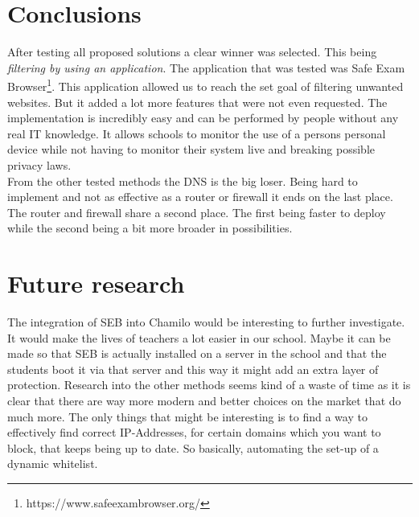 \documentclass[a0,portrait]{a0poster}
\begin{document}
\begin{multicols}{2}
\section*{Conclusions}
\color{black}
After testing all proposed solutions a clear winner was selected. This being \textit{filtering by using an application}. The application that was tested was Safe Exam Browser\footnote{https://www.safeexambrowser.org/}. This application allowed us to reach the set goal of filtering unwanted websites. But it added a lot more features that were not even requested. The implementation is incredibly easy and can be performed by people without any real IT knowledge. It allows schools to monitor the use of a persons personal device while not having to monitor their system live and breaking possible privacy laws.\\
From the other tested methods the DNS is the big loser. Being hard to implement and not as effective as a router or firewall it ends on the last place. The router and firewall share a second place. The first being faster to deploy while the second being a bit more broader in possibilities.
\color{HoGentAccent1} 
\section*{Future research}
\color{black}
The integration of SEB into Chamilo would be interesting to further investigate. It would
make the lives of teachers a lot easier in our school. Maybe it can be made so that SEB
is actually installed on a server in the school and that the students boot it via that server
and this way it might add an extra layer of protection. Research into the other methods
seems kind of a waste of time as it is clear that there are way more modern and better
choices on the market that do much more. The only things that might be interesting is to
find a way to effectively find correct IP-Addresses, for certain domains which you want
to block, that keeps being up to date. So basically, automating the set-up of a dynamic
whitelist.



\end{multicols}
\end{document}
